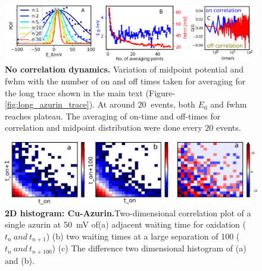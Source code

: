 \begin{figure}[!ht]
  \centering
  \includegraphics[width=\textwidth]{N_avgpoints_vs_fwhmwidth}
  \makeatletter
  \renewcommand{\fnum@figure}{\figurename~S\thefigure}
  \makeatother
  \caption{\textbf{No correlation dynamics.} Variation of midpoint potential and fwhm with the number of on and off times taken for averaging for the long trace shown in the main text (Figure-\ref{fig:long_azurin_trace}). At around $20~$ events, both $E_0$ and fwhm reaches plateau.
  The averaging of on-time and off-times for correlation and midpoint distribution were done every $20$ events.}
  \label{fig: N_avgpoints_vs_fwhmwidth}
\end{figure}


\begin{figure}[ht]
  \centering
  \includegraphics[width=\textwidth]{Figure_4_on_off_2D_100mV}
  \makeatletter
  \renewcommand{\fnum@figure}{\figurename~S\thefigure}
  \makeatother
  \caption{\textbf{2D histogram: Cu-Azurin.}Two-dimensional correlation plot of a single azurin at \SI{50}{\mV} of(a) adjacent waiting time for oxidation ($t_{n}~and~t_{n+1}$) (b) two waiting times at a large separation of 100 ($t_{n}~and~t_{n+100}$) (c) The difference two dimensional histogram of (a) and (b).}
  \label{SIfig:onoff2D}
\end{figure}